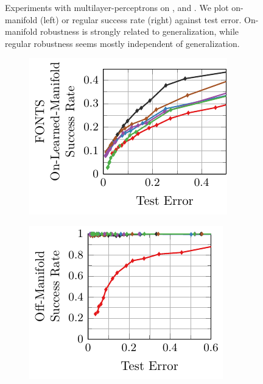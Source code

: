 \begin{appendix}
\begin{figure}[t]
{\begin{subfigure}{0.45\textwidth}
        \end{subfigure}
    }
    \caption{Experiments with multilayer-perceptrons on \Fonts, \MNIST and \Fashion. We plot on-manifold (left) or regular success rate (right) against test error. On-manifold robustness is strongly related to generalization, while regular robustness seems mostly independent of generalization.}
    \label{fig:appendix-mlp}
\end{figure}
\begin{figure}
    \centering
    \vskip -0.4cm
    \begin{subfigure}{0.245\textwidth}
        \centering
        \includegraphics[width=\textwidth]{appendix_resnet_fonts_error_on_learned.pdf}
    \end{subfigure}
    \begin{subfigure}{0.225\textwidth}
        \centering
        \includegraphics[width=\textwidth]{appendix_resnet_fonts_error_off.pdf}

\end{subfigure}
\end{figure}
\end{appendix}
